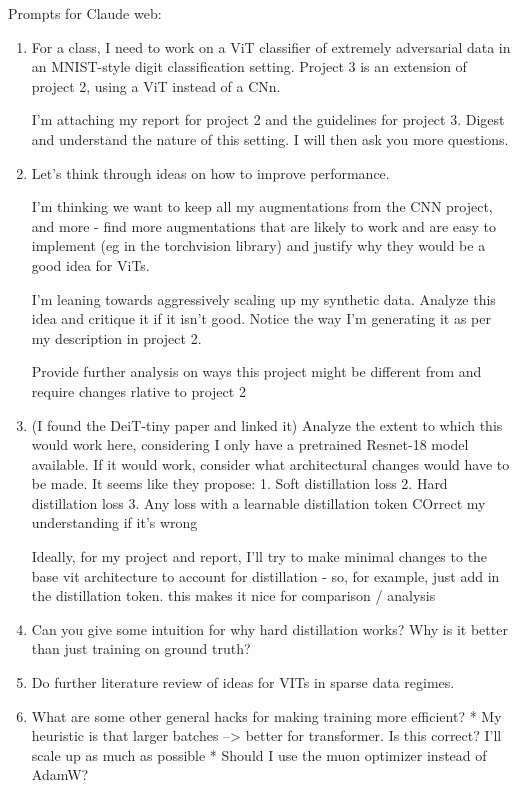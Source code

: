 \documentclass[11pt]{article}
\begin{document}
Prompts for Claude web:
\begin{enumerate}
    \item For a class, I need to work on a ViT classifier of extremely adversarial data in an MNIST-style digit classification setting. Project 3 is an extension of project 2, using a ViT instead of a CNn.

I'm attaching my report for project 2 and the guidelines for project 3. Digest and understand the nature of this setting. I will then ask you more questions.

\item Let's think through ideas on how to improve performance.

I'm thinking we want to keep all my augmentations from the CNN project, and more - find more augmentations that are likely to work and are easy to implement (eg in the torchvision library) and justify why they would be a good idea for ViTs.

I'm leaning towards aggressively scaling up my synthetic data. Analyze this idea and critique it if it isn't good. Notice the way I'm generating it as per my description in project 2.

Provide further analysis on ways this project might be different from and require changes rlative to project 2


\item (I found the DeiT-tiny paper and linked it) Analyze the extent to which this would work here, considering I only have a pretrained Resnet-18 model available. If it would work, consider what architectural changes would have to be made. It seems like they propose:
1. Soft distillation loss
2. Hard distillation loss
3. Any loss with a learnable distillation token
COrrect my understanding if it's wrong

Ideally, for my project and report, I'll try to make minimal changes to the base vit architecture to account for distillation - so, for example, just add in the distillation token. this makes it nice for comparison / analysis

\item Can you give some intuition for why hard distillation works? Why is it better than just training on ground truth?

\item Do further literature review of ideas for VITs in sparse data regimes.

\item What are some other general hacks for making training more efficient?
* My heuristic is that larger batches --> better for transformer. Is this correct? I'll scale up as much as possible
* Should I use the muon optimizer instead of AdamW?


\end{enumerate}
\end{document}
